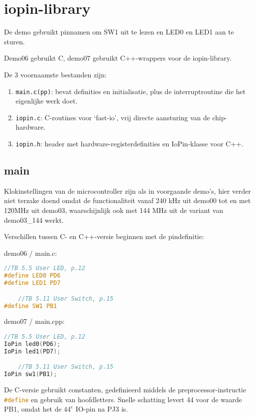 \documentclass[a4paper, 11pt, fleqn, twoside]{scrartcl}%
\begin{document}
\pagestyle{RvLpagina}

\section{iopin-library}
De demo gebruikt pinnamen om SW1 uit te lezen en LED0 en LED1 aan te sturen.

Demo06 gebruikt C, demo07 gebruikt C++-wrappers voor de iopin-library.

De 3 voornaamste bestanden zijn:
\begin{enumerate}
\item \verb|main.c(pp)|: bevat definities en initialisatie, plus de
  interruptroutine die het eigenlijke werk doet.
\item \verb|iopin.c|: C-routines voor `fast-io', vrij directe
  aansturing van de chip-hardware.
\item \verb|iopin.h|: header met hardware-registerdefinities en IoPin-klasse
  voor C++.
\end{enumerate}

\subsection{main}
Klokinstellingen van de microcontroller zijn als in voorgaande demo's, 
hier verder niet terzake doend omdat de functionaliteit vanaf 240 kHz uit 
demo00 tot en met 120MHz uit demo03, waarschijnlijk ook met 144 MHz uit de 
variant van demo03\_144 werkt.

Verschillen tussen C- en C++-versie beginnen met de pindefinitie:

demo06 / main.c:
\begin{lstlisting}[language=C,backgroundcolor=\color{orange!10},framerule=0pt,columns=fixed]
	//TB 5.5 User LED, p.12
#define LED0 PD6
#define LED1 PD7

	//TB 5.11 User Switch, p.15
#define SW1 PB1
\end{lstlisting}
demo07 / main.cpp:
\begin{lstlisting}[language=C,backgroundcolor=\color{orange!10},framerule=0pt,columns=fixed]
//TB 5.5 User LED, p.12
IoPin led0(PD6);
IoPin led1(PD7);

	//TB 5.11 User Switch, p.15
IoPin sw1(PB1);
\end{lstlisting}

De C-versie gebruikt constanten, gedefinieerd middels de preprocessor-instructie
\lstinline[language=C]!#define! en gebruik van hoofdletters.
Snelle schatting levert 44 voor de waarde PB1, omdat het de $44^e$ IO-pin 
na PJ3 is.\\
\end{document}
